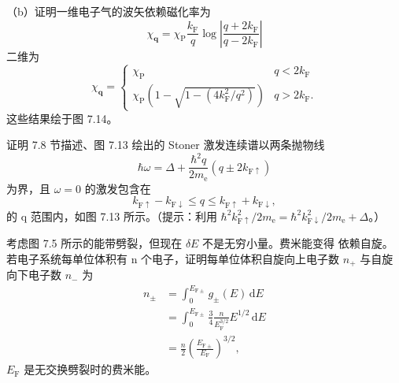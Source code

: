 （b）证明一维电子气的波矢依赖磁化率为
\begin{equation*}
\chi_{\mathbf{q}} = \chi_{\mathrm{P}}\frac{k_{\mathrm{F}}}{q}\log\left|\frac{q+2k_{\mathrm{F}}}{q-2k_{\mathrm{F}}}\right|\tag{7.103}
\end{equation*}
二维为
\begin{equation*}
\chi_{\mathbf{q}} = \begin{cases} \chi_{\mathrm{P}} & q<2k_{\mathrm{F}}\\ \chi_{\mathrm{P}}\left(1-\sqrt{1-(4k_{\mathrm{F}}^{2}/q^{2})}\right) & q>2k_{\mathrm{F}}. \end{cases}\tag{7.104}
\end{equation*}
这些结果绘于图 7.14。

 证明 7.8 节描述、图 7.13 绘出的 Stoner 激发连续谱以两条抛物线
\begin{equation*}
\hbar\omega = \Delta + \frac{\hbar^{2}q}{2m_{\mathrm{e}}}(q\pm2k_{\mathrm{F}\uparrow})\tag{7.105}
\end{equation*}
为界，且 $\omega=0$ 的激发包含在
\begin{equation*}
k_{\mathrm{F}\uparrow}-k_{\mathrm{F}\downarrow} \leq q \leq k_{\mathrm{F}\uparrow}+k_{\mathrm{F}\downarrow},\tag{7.106}
\end{equation*}
的 q 范围内，如图 7.13 所示。（提示：利用 $\hbar^{2}k_{\mathrm{F}\uparrow}^{2}/2m_{\mathrm{e}}=\hbar^{2}k_{\mathrm{F}\downarrow}^{2}/2m_{\mathrm{e}}+\Delta$。）

 考虑图 7.5 所示的能带劈裂，但现在 $\delta E$ 不是无穷小量。费米能变得
依赖自旋。若电子系统每单位体积有 n 个电子，证明每单位体积自旋向上电子数 $n_{+}$
与自旋向下电子数 $n_{-}$ 为
\begin{align*}
n_{\pm} &= \int_{0}^{E_{\mathrm{F}\pm}}g_{\pm}(E)\,\mathrm{d}E\tag{7.107}\\
&= \int_{0}^{E_{\mathrm{F}\pm}}\frac{3}{4}\frac{n}{E_{\mathrm{F}}^{3/2}}E^{1/2}\,\mathrm{d}E\tag{7.108}\\
&= \frac{n}{2}\left(\frac{E_{\mathrm{F}\pm}}{E_{\mathrm{F}}}\right)^{3/2},\tag{7.109}
\end{align*}
$E_{\mathrm{F}}$ 是无交换劈裂时的费米能。

